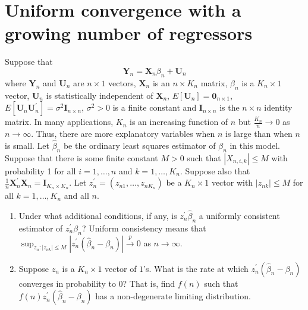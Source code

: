 \section{Uniform convergence with a growing number of regressors}

Suppose that
\[
  \mathbf{Y}_{n} = \mathbf{X}_{n} \beta_{n} + \mathbf{U}_{n}
\]
where \(\mathbf{Y}_{n}\) and \(\mathbf{U}_{n}\) are \(n \times 1\) vectors,
\(\mathbf{X}_{n}\) is an \(n \times K_{n}\) matrix, \(\beta_{n}\) is a \(K_{n}
\times 1\) vector, \(\mathbf{U}_{n}\) is statistically independent of
\(\mathbf{X}_{n}\), \(E \left[ \mathbf{U}_{n} \right] = \mathbf{0}_{n \times
1}\), \(E \left[ \mathbf{U}_{n} \mathbf{U}_{n}^{\prime} \right] = \sigma^{2}
\mathbf{I}_{n \times n}\), \(\sigma^{2} > 0\) is a finite constant and
\(\mathbf{I}_{n \times n}\) is the \(n \times n\) identity matrix. In many
applications, \(K_{n}\) is an increasing function of \(n\) but \(\frac{K_{n}}{n}
\to 0\) as \(n \to \infty\). Thus, there are more explanatory variables when
\(n\) is large than when \(n\) is small. Let \(\widehat{\beta}_{n}\) be the
ordinary least squares estimator of \(\beta_{n}\) in this model. Suppose that
there is some finite constant \(M > 0\) such that
\(\left| X_{n, i, k} \right| \leq M\) with probability 1 for all \(i = 1, \dots,
n\) and \(k = 1, \dots, K_{n}\). Suppose also that \(\frac{1}{n}
\mathbf{X}_{n}^{\prime} \mathbf{X}_{n} = \mathbf{I}_{K_{n} \times K_{n}}\).
Let \(z_{n}^{\prime} = \left( z_{n 1}, \dots, z_{n K_{n}} \right)\) be a \(K_{n}
\times 1\) vector with \(\left| z_{n k} \right| \leq M\) for all \(k = 1, \dots,
K_{n}\) and all \(n\).

\begin{enumerate}
  \item Under what additional conditions, if any, is \(z_{n}^{\prime}
  \widehat{\beta}_{n}\) a uniformly consistent estimator of \(z_{n}^{\prime}
  \beta_{n}\)? Uniform consistency means that \(\sup_{z_{n} : \left| z_{n k}
  \right| \leq M} \left| z_{n}^{\prime} \left( \widehat{\beta}_{n} - \beta_{n}
  \right) \right| \overset{p}{\to} 0\) as \(n \to \infty\).
  \item Suppose \(z_{n}\) is a \(K_{n} \times 1\) vector of \(1\)'s. What is the
  rate at which \(z_{n}^{\prime} \left( \widehat{\beta}_{n} - \beta_{n}
  \right)\) converges in probability to 0? That is, find \(f (n)\) such that \(f
  (n) z_{n}^{\prime} \left( \widehat{\beta}_{n} - \beta_{n} \right)\) has a
  non-degenerate limiting distribution.
\end{enumerate}

